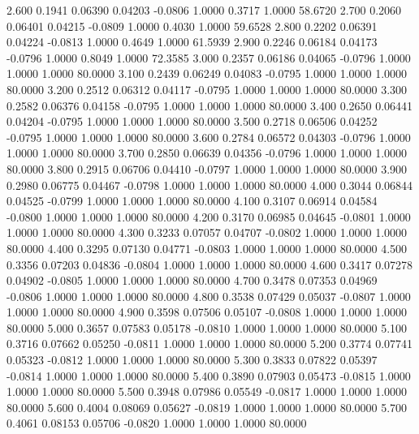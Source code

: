    2.600   0.1941   0.06390   0.04203  -0.0806   1.0000   0.3717   1.0000  58.6720
   2.700   0.2060   0.06401   0.04215  -0.0809   1.0000   0.4030   1.0000  59.6528
   2.800   0.2202   0.06391   0.04224  -0.0813   1.0000   0.4649   1.0000  61.5939
   2.900   0.2246   0.06184   0.04173  -0.0796   1.0000   0.8049   1.0000  72.3585
   3.000   0.2357   0.06186   0.04065  -0.0796   1.0000   1.0000   1.0000  80.0000
   3.100   0.2439   0.06249   0.04083  -0.0795   1.0000   1.0000   1.0000  80.0000
   3.200   0.2512   0.06312   0.04117  -0.0795   1.0000   1.0000   1.0000  80.0000
   3.300   0.2582   0.06376   0.04158  -0.0795   1.0000   1.0000   1.0000  80.0000
   3.400   0.2650   0.06441   0.04204  -0.0795   1.0000   1.0000   1.0000  80.0000
   3.500   0.2718   0.06506   0.04252  -0.0795   1.0000   1.0000   1.0000  80.0000
   3.600   0.2784   0.06572   0.04303  -0.0796   1.0000   1.0000   1.0000  80.0000
   3.700   0.2850   0.06639   0.04356  -0.0796   1.0000   1.0000   1.0000  80.0000
   3.800   0.2915   0.06706   0.04410  -0.0797   1.0000   1.0000   1.0000  80.0000
   3.900   0.2980   0.06775   0.04467  -0.0798   1.0000   1.0000   1.0000  80.0000
   4.000   0.3044   0.06844   0.04525  -0.0799   1.0000   1.0000   1.0000  80.0000
   4.100   0.3107   0.06914   0.04584  -0.0800   1.0000   1.0000   1.0000  80.0000
   4.200   0.3170   0.06985   0.04645  -0.0801   1.0000   1.0000   1.0000  80.0000
   4.300   0.3233   0.07057   0.04707  -0.0802   1.0000   1.0000   1.0000  80.0000
   4.400   0.3295   0.07130   0.04771  -0.0803   1.0000   1.0000   1.0000  80.0000
   4.500   0.3356   0.07203   0.04836  -0.0804   1.0000   1.0000   1.0000  80.0000
   4.600   0.3417   0.07278   0.04902  -0.0805   1.0000   1.0000   1.0000  80.0000
   4.700   0.3478   0.07353   0.04969  -0.0806   1.0000   1.0000   1.0000  80.0000
   4.800   0.3538   0.07429   0.05037  -0.0807   1.0000   1.0000   1.0000  80.0000
   4.900   0.3598   0.07506   0.05107  -0.0808   1.0000   1.0000   1.0000  80.0000
   5.000   0.3657   0.07583   0.05178  -0.0810   1.0000   1.0000   1.0000  80.0000
   5.100   0.3716   0.07662   0.05250  -0.0811   1.0000   1.0000   1.0000  80.0000
   5.200   0.3774   0.07741   0.05323  -0.0812   1.0000   1.0000   1.0000  80.0000
   5.300   0.3833   0.07822   0.05397  -0.0814   1.0000   1.0000   1.0000  80.0000
   5.400   0.3890   0.07903   0.05473  -0.0815   1.0000   1.0000   1.0000  80.0000
   5.500   0.3948   0.07986   0.05549  -0.0817   1.0000   1.0000   1.0000  80.0000
   5.600   0.4004   0.08069   0.05627  -0.0819   1.0000   1.0000   1.0000  80.0000
   5.700   0.4061   0.08153   0.05706  -0.0820   1.0000   1.0000   1.0000  80.0000
